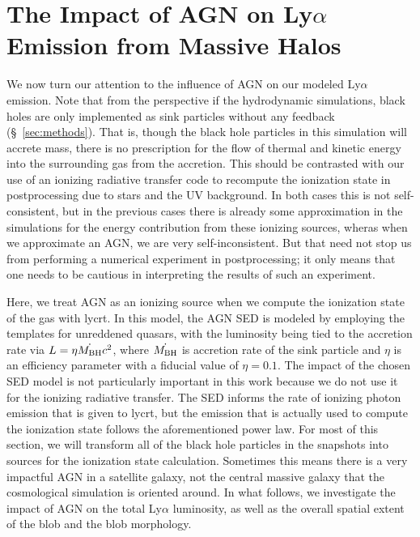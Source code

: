 \chapter{The Impact of AGN on Ly\texorpdfstring{$\alpha$}{a} Emission from Massive Halos}
\label{sec:agn}

We now turn our attention to the influence of AGN on our modeled Ly$\alpha$ emission.
Note that from the perspective if the hydrodynamic simulations, black holes are only implemented as sink particles without any feedback (\S~\ref{sec:methods}).
That is, though the black hole particles in this simulation will accrete mass, there is no prescription for the flow of thermal and kinetic energy into the surrounding gas from the accretion.
This should be contrasted with our use of an ionizing radiative transfer code to recompute the ionization state in postprocessing due to stars and the UV background.
In both cases this is not self-consistent, but in the previous cases there is already some approximation in the simulations for the energy contribution from these ionizing sources, wheras when we approximate an AGN, we are very self-inconsistent.
But that need not stop us from performing a numerical experiment in postprocessing; it only means that one needs to be cautious in interpreting the results of such an experiment.

Here, we treat AGN as an ionizing source when we compute the ionization state of the gas with {\sc lycrt}.
In this model, the AGN SED is modeled by employing the \citet*{Hopkins2007} templates for unreddened quasars, with the luminosity being tied to the accretion rate via $L = \eta \dot{M_{\rm BH}} c^2$, where $\dot{M_{\rm BH}}$ is accretion rate of the sink particle and $\eta$ is an efficiency parameter with a fiducial value of $\eta = 0.1$.
The impact of the chosen SED model is not particularly important in this work because we do not use it for the ionizing radiative transfer.
The SED informs the rate of ionizing photon emission that is given to {\sc lycrt}, but the emission that is actually used to compute the ionization state follows the aforementioned power law.
For most of this section, we will transform all of the black hole particles in the snapshots into sources for the ionization state calculation.
Sometimes this means there is a very impactful AGN in a satellite galaxy, not the central massive galaxy that the cosmological simulation is oriented around.
In what follows, we investigate the impact of AGN on the total Ly$\alpha$ luminosity, as well as the overall spatial extent of the blob and the blob morphology.

